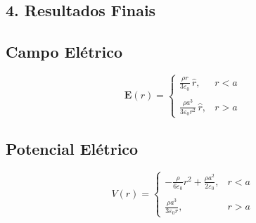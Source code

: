 \documentclass[a4paper,12pt]{article}
\begin{document}
\begin{flushleft}
\section*{4. Resultados Finais}

\subsection*{Campo Elétrico}

\begin{equation}
\mathbf{E}(r) = 
\begin{cases}
\displaystyle \frac{\rho r}{3\varepsilon_0}\, \hat{r}, & r < a \\
\\
\displaystyle \frac{\rho a^3}{3\varepsilon_0 r^2}\, \hat{r}, & r > a
\end{cases}
\end{equation}

\subsection*{Potencial Elétrico}

\begin{equation}
V(r) = 
\begin{cases}
\displaystyle -\frac{\rho}{6\varepsilon_0} r^2 + \frac{\rho a^2}{2\varepsilon_0}, & r < a \\
\\
\displaystyle \frac{\rho a^3}{3\varepsilon_0 r}, & r > a
\end{cases}
\end{equation}
\end{flushleft}
\end{document}
